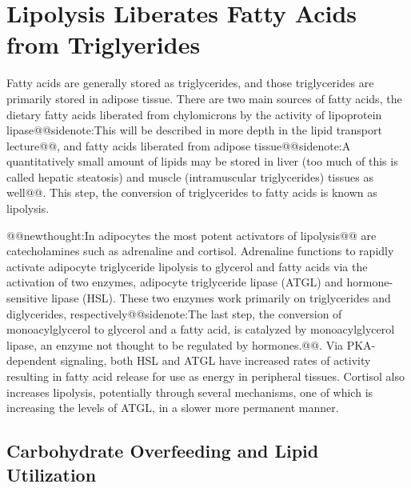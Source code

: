 \documentclass{tufte-handout}
\makeatletter
\def\newthought#1{@@newthought:#1@@}
\def\sidenote#1{@@sidenote:#1@@}
\makeatother
\begin{document}
\section{Lipolysis Liberates Fatty Acids from Triglyerides}
Fatty acids are generally stored as triglycerides, and those triglycerides are primarily stored in adipose tissue.  There are two main sources of fatty acids, the dietary fatty acids liberated from chylomicrons by the activity of lipoprotein lipase\sidenote{This will be described in more depth in the lipid transport lecture}, and fatty acids liberated from adipose tissue\sidenote{A quantitatively small amount of lipids may be stored in liver (too much of this is called hepatic steatosis) and muscle (intramuscular triglycerides) tissues as well}.  This step, the conversion of triglycerides to fatty acids is known as lipolysis.

\newthought{In adipocytes the most potent activators of lipolysis} are catecholamines such as adrenaline and cortisol.  Adrenaline functions to rapidly activate adipocyte triglyceride lipolysis to glycerol and fatty acids via the activation of two enzymes, adipocyte triglyceride lipase (ATGL) and hormone-sensitive lipase (HSL).  These two enzymes work primarily on triglycerides and diglycerides, respectively\sidenote{The last step, the conversion of monoacylglycerol to glycerol and a fatty acid, is catalyzed by monoacylglycerol lipase, an enzyme not thought to be regulated by hormones.}.  Via PKA-dependent signaling, both HSL and ATGL have increased rates of activity resulting in fatty acid release for use as energy in peripheral tissues.  Cortisol also increases lipolysis, potentially through several mechanisms, one of which is increasing the levels of ATGL, in a slower more permanent manner.  

\subsection{Carbohydrate Overfeeding and Lipid Utilization}
\end{document}
